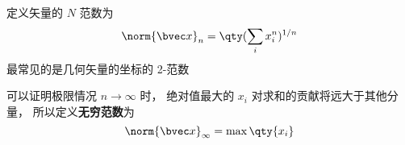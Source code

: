 
定义矢量的 $N$ 范数为
\begin{equation}
\norm{\bvec x}_n = \qty(\sum_i x_i^n)^{1/n}
\end{equation}
最常见的是几何矢量的坐标的 2-范数

可以证明极限情况 $n \to \infty$ 时， 绝对值最大的 $x_i$ 对求和的贡献将远大于其他分量， 所以定义\textbf{无穷范数}为
\begin{equation}
\norm{\bvec x}_\infty = \max \qty{x_i}
\end{equation}
